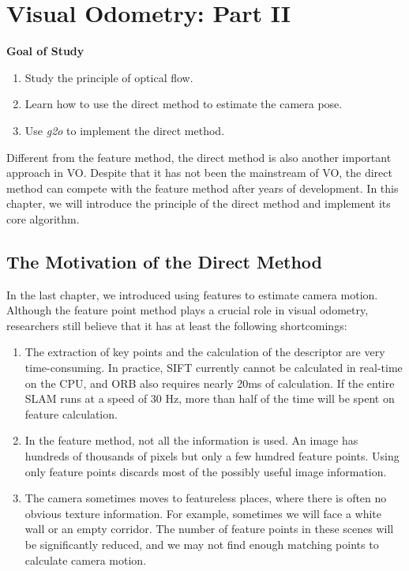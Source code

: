 \chapter{Visual Odometry: Part II}
\label{cpt:vo2}
\label{cpt:8}
\begin{mdframed}  
	\textbf{Goal of Study}
	\begin{enumerate}[labelindent=0em,leftmargin=1.5em]
		\item Study the principle of optical flow.
		\item Learn how to use the direct method to estimate the camera pose.
        \item Use \textit{g2o} to implement the direct method.
	\end{enumerate}
\end{mdframed}

Different from the feature method, the direct method is also another important approach in VO. Despite that it has not been the mainstream of VO, the direct method can compete with the feature method after years of development. In this chapter, we will introduce the principle of the direct method and implement its core algorithm.

\newpage


\newpage
\section{The Motivation of the Direct Method}
In the last chapter, we introduced using features to estimate camera motion. Although the feature point method plays a crucial role in visual odometry, researchers still believe that it has at least the following shortcomings:

\begin{enumerate}
	\item The extraction of key points and the calculation of the descriptor are very time-consuming. In practice, SIFT currently cannot be calculated in real-time on the CPU, and ORB also requires nearly 20ms of calculation. If the entire SLAM runs at a speed of 30 Hz, more than half of the time will be spent on feature calculation.

	\item In the feature method, not all the information is used. An image has hundreds of thousands of pixels but only a few hundred feature points. Using only feature points discards most of the possibly useful image information. 
	
	\item The camera sometimes moves to featureless places, where there is often no obvious texture information. For example, sometimes we will face a white wall or an empty corridor. The number of feature points in these scenes will be significantly reduced, and we may not find enough matching points to calculate camera motion.
\end{enumerate}

